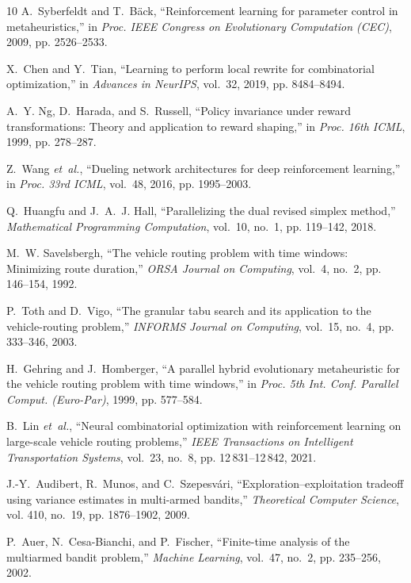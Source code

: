 \documentclass{ieeeaccess}
\begin{document}
{\begin{thebibliography}{10}
A.~Syberfeldt and T.~B{\"a}ck, ``Reinforcement learning for parameter control in metaheuristics,'' in \emph{Proc. IEEE Congress on Evolutionary Computation (CEC)}, 2009, pp. 2526--2533.

X.~Chen and Y.~Tian, ``Learning to perform local rewrite for combinatorial optimization,'' in \emph{Advances in NeurIPS}, vol.~32, 2019, pp. 8484--8494.

A.~Y. Ng, D.~Harada, and S.~Russell, ``Policy invariance under reward transformations: Theory and application to reward shaping,'' in \emph{Proc. 16th ICML}, 1999, pp. 278--287.

Z.~Wang \emph{et~al.}, ``Dueling network architectures for deep reinforcement learning,'' in \emph{Proc. 33rd ICML}, vol.~48, 2016, pp. 1995--2003.

Q.~Huangfu and J.~A.~J. Hall, ``Parallelizing the dual revised simplex method,'' \emph{Mathematical Programming Computation}, vol.~10, no.~1, pp. 119--142, 2018.

M.~W. Savelsbergh, ``The vehicle routing problem with time windows: Minimizing route duration,'' \emph{ORSA Journal on Computing}, vol.~4, no.~2, pp. 146--154, 1992.

P.~Toth and D.~Vigo, ``The granular tabu search and its application to the vehicle-routing problem,'' \emph{INFORMS Journal on Computing}, vol.~15, no.~4, pp. 333--346, 2003.

H.~Gehring and J.~Homberger, ``A parallel hybrid evolutionary metaheuristic for the vehicle routing problem with time windows,'' in \emph{Proc. 5th Int. Conf. Parallel Comput. (Euro-Par)}, 1999, pp. 577--584.

B.~Lin \emph{et~al.}, ``Neural combinatorial optimization with reinforcement learning on large-scale vehicle routing problems,'' \emph{IEEE Transactions on Intelligent Transportation Systems}, vol.~23, no.~8, pp. 12\,831--12\,842, 2021.

J.-Y.~Audibert, R.~Munos, and C.~Szepesv{\'a}ri, ``Exploration--exploitation tradeoff using variance estimates in multi-armed bandits,'' \emph{Theoretical Computer Science}, vol. 410, no.~19, pp. 1876--1902, 2009.

P.~Auer, N.~Cesa-Bianchi, and P.~Fischer, ``Finite-time analysis of the multiarmed bandit problem,'' \emph{Machine Learning}, vol.~47, no.~2, pp. 235--256, 2002.


\end{thebibliography}}
\end{document}
